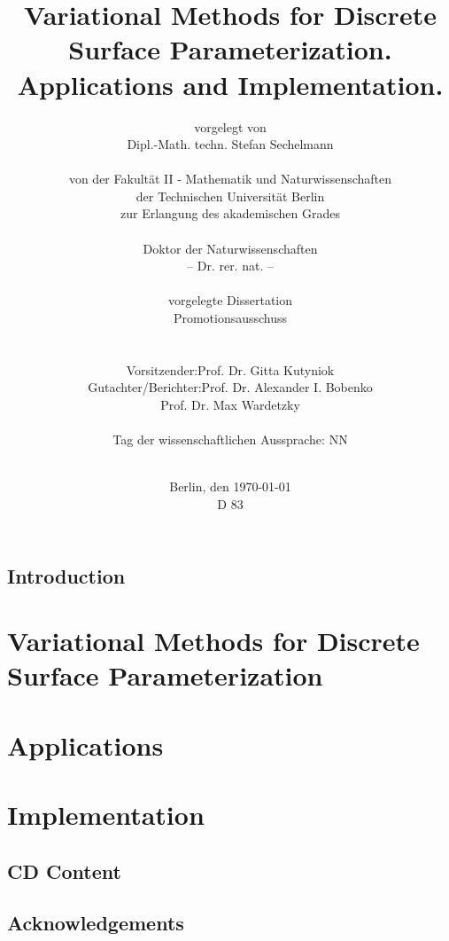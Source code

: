 \documentclass[a4paper]{book}
\title{Variational Methods for Discrete Surface Parameterization. Applications and Implementation.}
\author{
vorgelegt von\\
Dipl.-Math. techn. Stefan Sechelmann\\
\vspace{0.3cm}\\
von der Fakult{\"a}t II - Mathematik und Naturwissenschaften\\
der Technischen Universit{\"a}t Berlin\\
zur Erlangung des akademischen Grades\\
\vspace{0.3cm}\\
Doktor der Naturwissenschaften\\
-- Dr. rer. nat. --\\
\vspace{0.3cm}\\
vorgelegte Dissertation
\vspace{1.5cm}\\
Promotionsausschuss\\
\vspace{0.3cm}\\
\begin{tabular}{rl}
Vorsitzender: & Prof. Dr. Gitta Kutyniok \\
Gutachter/Berichter: & Prof. Dr. Alexander I. Bobenko \\
& Prof. Dr. Max Wardetzky 
\end{tabular}
\vspace{0.3cm}\\
Tag der wissenschaftlichen Aussprache: NN\\
\vspace{1cm}\\
}
\date{
	Berlin, den {\selectlanguage{german}\today}\\
	\vspace{0.3cm}
	D 83
}
\def\mainbibliography {
	\backmatter
	\setcounter{secnumdepth}{-1} 
	
	
}
\def\subfilebibliography {
	\backmatter
	\setcounter{secnumdepth}{-1}
	
	
}
\def\subfilebibliographytwo {
	\backmatter
	\setcounter{secnumdepth}{-1} 
	
	
}
\begin{document}
\def\subfilebibliography{}
\def\subfilebibliographytwo{}

\frontmatter
\maketitle
\newpage

\tableofcontents
\newpage

\newpage
\mainmatter
\setcounter{secnumdepth}{-1} 
\chapter{Introduction}
\setcounter{secnumdepth}{2} 
\part{Variational Methods for Discrete Surface Parameterization} 
\label{part:variational}
%
%





\part{Applications}
\label{part:applications}



\part{Implementation}
\label{part:implementation}





\newpage 
\mainbibliography

\appendix
\chapter{CD Content}

\chapter{Acknowledgements}
\end{document}

